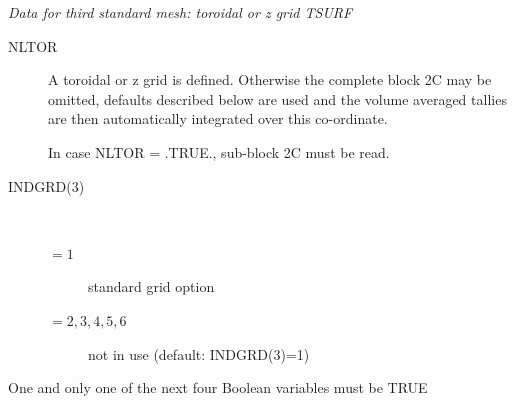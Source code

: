 \medskip

\textsl{Data for third standard mesh: toroidal or z grid TSURF}
\begin{description}
  \item[NLTOR] A toroidal or z grid is defined.
        Otherwise the complete block 2C may be omitted, defaults described below are
        used and the volume averaged tallies are then automatically integrated over
        this co-ordinate.

        In case NLTOR = .TRUE., sub-block 2C must be read.
  \item[INDGRD(3)] ~ 

        \begin{description}
          \item[$= 1$] standard grid option
          \item[$= 2, 3, 4, 5, 6$]
                not in use (default: INDGRD(3)=1)
        \end{description}
\end{description}
One and
only one of the next four Boolean variables must be TRUE
